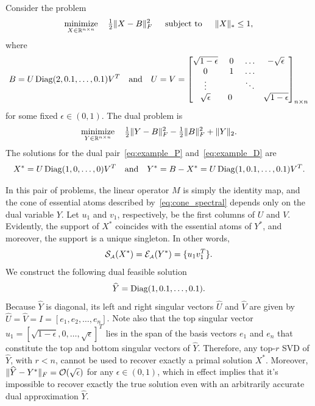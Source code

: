 \begin{example}\label{ex:partial-svd}
	Consider the problem
\begin{align} \label{eq:example_P}
  \displaystyle\mathop{\hbox{\rm minimize}}_{ X \in \mathbb{R}^{n \times n} }\enspace\enspace {\textstyle{\frac{1}{2}}} \| X - B \|_F^2 \enspace\hbox{\quad subject to\quad}\enspace \| X \|_* \leq 1,
\end{align} 
where
\[
  B = U \operatorname{Diag}( 2, 0.1, \ldots, 0.1 ) V^T \hbox{\quad and\quad} U = V = \begin{bmatrix}
    \sqrt{1 - \epsilon} &~ 0 &  ~\ldots  & -\sqrt{ \epsilon } \\
    0 & ~1  &  ~\ldots &  \\
    \vdots &  &~\ddots & \\
    \sqrt{ \epsilon } & 0 & & \sqrt{1 - \epsilon}
    \end{bmatrix}_{n \times n}
\]
for some fixed $\epsilon \in (0,1)$. The dual problem is
\begin{align}
  \displaystyle\mathop{\hbox{\rm minimize}}_{Y \in \mathbb{R}^{n \times n} }\enspace\enspace {\textstyle{\frac{1}{2}}} \| Y - B \|_F^2 - {\textstyle{\frac{1}{2}}} \| B \|_F^2 + \|Y\|_2. \label{eq:example_D}
\end{align}
The solutions for the dual pair~\eqref{eq:example_P} and~\eqref{eq:example_D} are
\[
  X^* =  U \operatorname{Diag}( 1, 0, \ldots, 0 ) V^T \hbox{\quad and\quad} Y^* = B - X^* = U \operatorname{Diag}( 1, 0.1, \ldots, 0.1 ) V^T.
\]

In this pair of problems, the linear operator $M$ is simply the identity map, and the cone of essential atoms described by~\eqref{eq:cone_spectral} depends only on the dual variable $Y$.  Let $u_1$ and $v_1$, respectively, be the first columns of $U$ and $V$. Evidently, the support of $X^*$ coincides with the essential atoms of $Y^*$, and moreover, the support is a unique singleton. In other words,
\[
  \operatorname{\mathcal{S}_{\scriptscriptstyle\mathcal{A}}}(X^*) = \mathcal{E}_{\scriptscriptstyle\mathcal{A}}(Y^*) = \{u_1 v_1^T\}.
\]
We construct the following dual feasible solution
\[
  \widehat{Y} = \operatorname{Diag}(1, 0.1, \ldots, 0.1).
\]
Because $\widehat Y$ is diagonal, its left and right singular vectors $\widehat{U}$ and $\widehat{V}$ are given by $\widehat{U} = \widehat{V} = I = [e_1, e_2, \ldots, e_n]$. Note also that the top singular vector $u_1 = [\sqrt{1 - \epsilon}, 0, \ldots, \sqrt{\epsilon}]^T$ lies in the span of the basis vectors $e_1$ and $e_n$ that constitute the top and bottom singular vectors of $\widehat{Y}$. Therefore, any top-$r$ SVD of $\widehat{Y}$, with $r < n$, cannot be used to recover exactly a primal solution $X^*$. Moreover, $\| \widehat{Y} - Y^* \|_F = \mathcal{O}( \sqrt{\epsilon} )$ for any $\epsilon\in(0,1)$, which in effect implies that it's impossible to recover exactly the true solution even with an arbitrarily accurate dual approximation $\widehat{Y}$.
\end{example}

